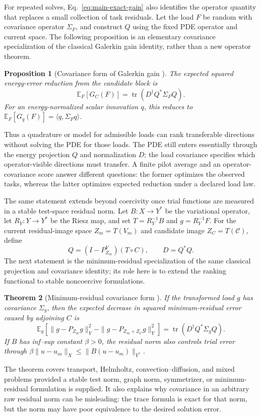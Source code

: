 \documentclass[11pt]{article}
\newtheorem{theorem}{Theorem}[section]
\newtheorem{proposition}[theorem]{Proposition}
\numberwithin{algorithm}{section}
\theoremstyle{definition}\newtheorem{definition}[theorem]{Definition}
\theoremstyle{remark}\newtheorem{remark}[theorem]{Remark}
\begin{document}
\secondarytheoryA
For repeated solves, Eq.~\eqref{eq:main-exact-gain} also identifies the
operator quantity that replaces a small collection of task residuals.  Let
the load $F$ be random with covariance operator $\Sigma_F$, and construct
$Q$ using the fixed PDE operator and current space.
The following proposition is an elementary covariance specialization of the
classical Galerkin gain identity, rather than a new operator theorem.
\begin{proposition}[Covariance form of Galerkin gain
  {\cite{ciarlet1978}}]
\label{prop:operator-covariance-gain}
The expected squared energy-error reduction from the candidate block is
\begin{equation}
 \mathbb E_F[G_C(F)]
 =\operatorname{tr}\!\left(D^\dagger Q^*\Sigma_F Q\right).
 \label{eq:operator-covariance-gain}
\end{equation}
For an energy-normalized scalar innovation $q$, this reduces to
$\mathbb E_F[G_q(F)]=\langle q,\Sigma_Fq\rangle$.
\end{proposition}
Thus a quadrature or model for admissible loads can rank transferable
directions without solving the PDE for those loads.  The PDE still enters
essentially through the energy projection $Q$ and normalization $D$; the load
covariance specifies which operator-visible directions must transfer.  A
finite pilot average and an operator-covariance score answer different
questions: the former optimizes the observed tasks, whereas the latter
optimizes expected reduction under a declared load law.

The same statement extends beyond coercivity once trial functions are measured
in a stable test-space residual norm.  Let $B:X\to Y^*$ be the variational
operator, let $R_Y:Y\to Y^*$ be the Riesz map, and set
$T=R_Y^{-1}B$ and $g=R_Y^{-1}F$.  For the current residual-image space
$Z_m=T(V_m)$ and candidate image $Z_C=T(\mathcal C)$, define
\[
 Q=(I-P_{Z_m}^Y)(T\circ C),\qquad D=Q^*Q.
\]
The next statement is the minimum-residual specialization of the same
classical projection and covariance identity; its role here is to extend the
ranking functional to stable noncoercive formulations.
\begin{theorem}[Minimum-residual covariance form
  {\cite{demkowiczgopalakrishnan2011}}]
\label{thm:minres-operator-covariance}
If the transformed load $g$ has covariance $\Sigma_g$, then the expected
decrease in squared minimum-residual error caused by adjoining $C$ is
\begin{equation}
 \mathbb E_g\!\left[
 \|g-P_{Z_m}g\|_Y^2-
 \|g-P_{Z_m+Z_C}g\|_Y^2\right]
 =\operatorname{tr}(D^\dagger Q^*\Sigma_gQ).
 \label{eq:minres-operator-covariance}
\end{equation}
If $B$ has inf--sup constant $\beta>0$, the residual norm also controls trial
error through $\beta\|u-u_m\|_X\leq\|B(u-u_m)\|_{Y^*}$.
\end{theorem}
The theorem covers transport, Helmholtz, convection--diffusion, and mixed
problems provided a stable test norm, graph norm, symmetrizer, or
minimum-residual formulation is supplied.  It also explains why covariance in
an arbitrary raw residual norm can be misleading: the trace formula is exact
for that norm, but the norm may have poor equivalence to the desired solution
error.
\endsecondarytheoryA
\end{document}
